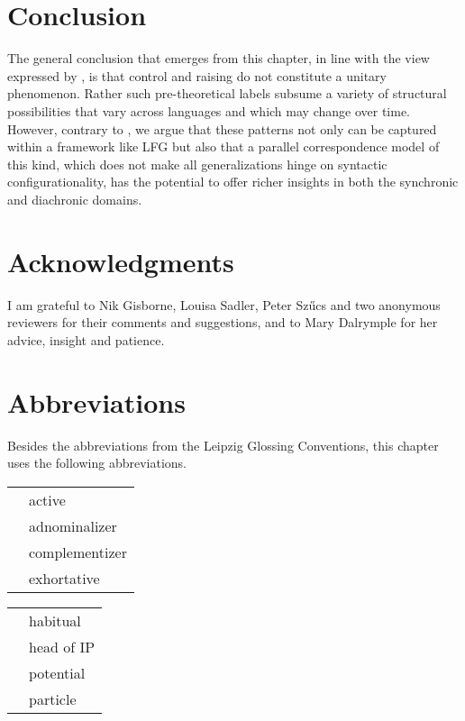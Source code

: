 \documentclass[output=paper,hidelinks]{langscibook}
\begin{document}
\section{Conclusion}
\label{sec:Control:14}

The general conclusion that emerges from this chapter, in line with the view expressed by \citet[257--258]{Landau2013}, is that control and raising do not constitute a unitary phenomenon. Rather such pre-theoretical labels subsume a variety of structural possibilities that vary across languages and which may change over time. However, contrary to \citet{Landau2013,Landau2015}, we argue that these patterns not only can be captured within a framework like LFG but also that a parallel correspondence model of this kind, which does not make all generalizations hinge on syntactic configurationality, has the potential to offer richer insights in both the synchronic and diachronic domains.

\section*{Acknowledgments}

I am grateful to Nik Gisborne, Louisa Sadler, Peter Sz\H{u}cs and two anonymous reviewers for their comments and suggestions, and to Mary Dalrymple for her advice, insight and patience.

\section*{Abbreviations}

Besides the abbreviations from the Leipzig Glossing Conventions, this
chapter uses the following abbreviations.\medskip

\noindent\begin{tabularx}{.45\textwidth}{lQ}
 & active\\
 & adnominalizer\\
 & complementizer\\
 & exhortative\\
\end{tabularx}\begin{tabularx}{.45\textwidth}{lQ}
 & habitual\\
 & head of IP\\
 & potential\\
 & particle\\
\end{tabularx}

\sloppy
\printbibliography[heading=subbibliography,notkeyword=this]
\end{document}
